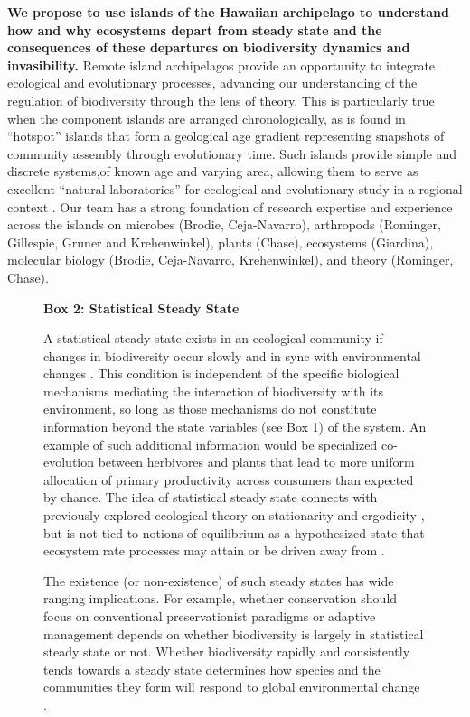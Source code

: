 \documentclass[11pt]{article}
\begin{document}
\textbf{We propose to use islands of the Hawaiian archipelago to
  understand how and why ecosystems depart from steady state and the
  consequences of these departures on biodiversity dynamics and
  invasibility.}  Remote island archipelagos provide an opportunity to
integrate ecological and evolutionary processes, advancing our
understanding of the regulation of biodiversity through the lens of
theory.  This is particularly true when the component islands are
arranged chronologically, as is found in ``hotspot'' islands that form
a geological age gradient representing snapshots of community assembly
through evolutionary time. Such islands provide simple and discrete
systems,of known age and varying area, allowing them to serve as
excellent ``natural laboratories'' for ecological and evolutionary
study in a regional context \citep{simon1987, chadwick1999,
  gillespieClague2009}. Our team has a strong foundation of research
expertise and experience across the islands on microbes (Brodie,
Ceja-Navarro), arthropods (Rominger, Gillespie, Gruner and
Krehenwinkel), plants (Chase), ecosystems (Giardina), molecular
biology (Brodie, Ceja-Navarro, Krehenwinkel), and theory (Rominger,
Chase).

%
\begin{figure}
\vspace{-50pt}
\colorbox{gray!20}{
  \begin{minipage}{0.45\textwidth}
    \noindent    
    {\bf Box 2: Statistical Steady State} 

    A statistical steady state exists in an ecological community if
    changes in biodiversity occur slowly and in sync with
    environmental changes \citep{harte2011}. This condition is
    independent of the specific biological mechanisms mediating the
    interaction of biodiversity with its environment, so long as those
    mechanisms do not constitute information beyond the state
    variables (see Box 1) of the system. An example of such additional
    information would be specialized co-evolution between herbivores
    and plants that lead to more uniform allocation of primary
    productivity across consumers than expected by chance.  The idea
    of statistical steady state connects with previously explored
    ecological theory on stationarity and ergodicity
    \citep{maurer1999}, but is not tied to notions of equilibrium as a
    hypothesized state that ecosystem rate processes may attain or be
    driven away from \citep[e.g. not:][]{levin1970, scholz1997,
      rabosky2009}.

    The existence (or non-existence) of such steady states has wide
    ranging implications. For example, whether conservation should
    focus on conventional preservationist paradigms or adaptive
    management \citep{levin1999} depends on whether biodiversity is
    largely in statistical steady state or not. Whether biodiversity
    rapidly and consistently tends towards a steady state determines
    how species and the communities they form will respond to global
    environmental change \citep{barnosky2012}.
  \end{minipage}
}
\vspace{-10pt}
\end{figure}
%
\end{document}
